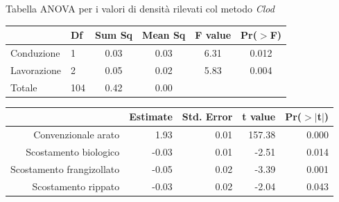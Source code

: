 \documentclass[10pt]{beamer}
\begin{document}
\begin{frame}{Tabella ANOVA per i valori di densità rilevati col metodo \emph{Clod}}
  \begin{table}
    \centering
    \begin{tabular}{llcccc}
      \hline
      & Df & Sum Sq & Mean Sq & F value & Pr($>$F) \\ 
      \hline
      Conduzione & 1 & 0.03 & 0.03 & 6.31 & 0.012 \\ 
      Lavorazione & 2 & 0.05 & 0.02 & 5.83 & 0.004 \\ 
      Totale & 104 & 0.42 & 0.00 &  &  \\ 
      \hline
    \end{tabular}
    \label{tab:Anova densita per spinta}
  \end{table}
\end{frame}

\begin{frame}[label=summary]
  \footnotesize
  \begin{table}[ht]
    \centering
    \begin{tabular}{rrrrr}
      \hline
      & Estimate & Std. Error & t value & Pr($>$$|$t$|$) \\ 
      \hline
      Convenzionale arato & 1.93 & 0.01 & 157.38 & 0.000 \\ 
      Scostamento biologico & -0.03 & 0.01 & -2.51 & 0.014 \\ 
      Scostamento frangizollato & -0.05 & 0.02 & -3.39 & 0.001 \\ 
      Scostamento rippato & -0.03 & 0.02 & -2.04 & 0.043 \\ 
      \hline
    \end{tabular}
    \label{tab:Riassunto densita spinta}
  \end{table}
\end{frame}
\end{document}
